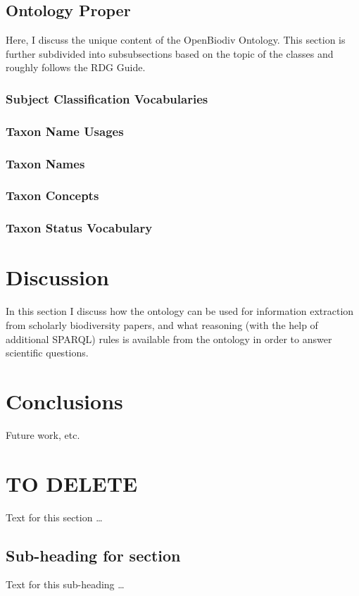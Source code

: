 \documentclass{bmcart}
\begin{document}
\subsection*{Ontology Proper}

Here, I discuss the unique content of the OpenBiodiv Ontology. This section is further subdivided into subsubsections based on the topic of the classes and roughly follows the RDG Guide.

\subsubsection*{Subject Classification Vocabularies}
\subsubsection*{Taxon Name Usages}
\subsubsection*{Taxon Names}
\subsubsection*{Taxon Concepts}
\subsubsection*{Taxon Status Vocabulary}

\section*{Discussion}

In this section I discuss how the ontology can be used for information extraction from scholarly biodiversity papers, and what reasoning (with the help of additional SPARQL) rules is available from the ontology in order to answer scientific questions.

\section*{Conclusions}

Future work, etc.

\section*{TO DELETE}

Text for this section \ldots
\subsection*{Sub-heading for section}
Text for this sub-heading \ldots
\end{document}

